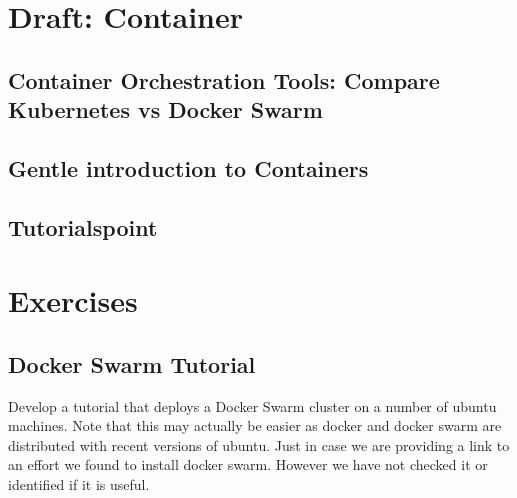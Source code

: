 
\chapter{Draft: Container}

\FILENAME




\section{Container Orchestration Tools: Compare Kubernetes vs Docker Swarm}


\section{Gentle introduction to Containers}


\section{Tutorialspoint}





\chapter{Exercises}

\section{Docker Swarm Tutorial}

\begin{exercise}

  Develop a tutorial that deploys a Docker Swarm cluster on a number
  of ubuntu machines. Note that this may actually be easier as docker
  and docker swarm are distributed with recent versions of
  ubuntu. Just in case we are providing a link to an effort we found
  to install docker swarm. However we have not checked it or
  identified if it is useful.
 

\end{exercise}


